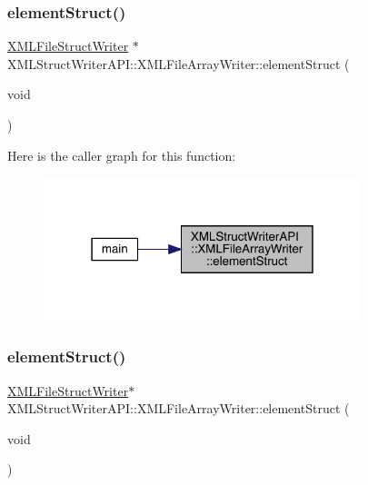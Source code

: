 \subsubsection{\texorpdfstring{elementStruct()}{elementStruct()}\hspace{0.1cm}{\footnotesize\ttfamily [1/2]}}
{\footnotesize\ttfamily \mbox{\hyperlink{classXMLStructWriterAPI_1_1XMLFileStructWriter}{X\+M\+L\+File\+Struct\+Writer}} $\ast$ X\+M\+L\+Struct\+Writer\+A\+P\+I\+::\+X\+M\+L\+File\+Array\+Writer\+::element\+Struct (\begin{DoxyParamCaption}\item[{void}]{ }\end{DoxyParamCaption})}

Here is the caller graph for this function\+:\nopagebreak
\begin{figure}[H]
\begin{center}
\leavevmode
\includegraphics[width=262pt]{d1/d9d/classXMLStructWriterAPI_1_1XMLFileArrayWriter_aca9a5098cc4549e2001fc148ccb6329e_icgraph}
\end{center}
\end{figure}
\mbox{\label{classXMLStructWriterAPI_1_1XMLFileArrayWriter_a53910cfce30307c3333d553b7f018e64}} 
\subsubsection{\texorpdfstring{elementStruct()}{elementStruct()}\hspace{0.1cm}{\footnotesize\ttfamily [2/2]}}
{\footnotesize\ttfamily \mbox{\hyperlink{classXMLStructWriterAPI_1_1XMLFileStructWriter}{X\+M\+L\+File\+Struct\+Writer}}$\ast$ X\+M\+L\+Struct\+Writer\+A\+P\+I\+::\+X\+M\+L\+File\+Array\+Writer\+::element\+Struct (\begin{DoxyParamCaption}\item[{void}]{ }\end{DoxyParamCaption})}



